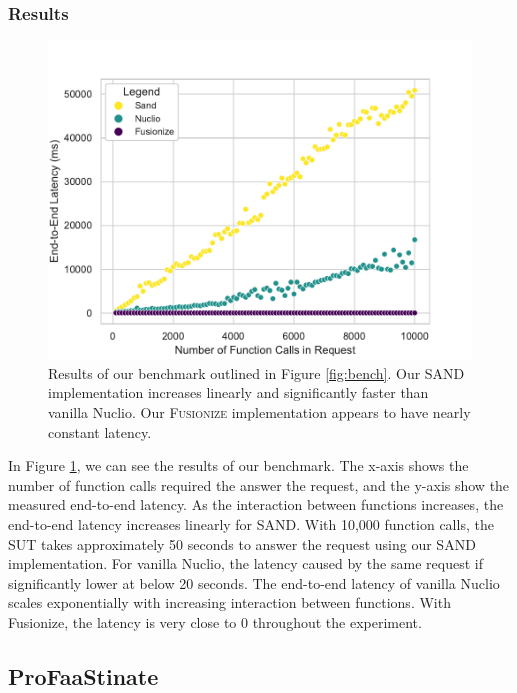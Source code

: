 \subsubsection{Results}

\begin{figure}
    \centering
    \includegraphics[width=\linewidth]{figures/latency_sand_fusionize}
    \caption{
        Results of our benchmark outlined in Figure \ref{fig:bench}. Our SAND
        implementation increases linearly and significantly faster than vanilla
        Nuclio. Our \textsc{Fusionize} implementation appears to have nearly
        constant latency.
    }
    \label{fig:latency_sand_fusionize}
\end{figure}


In Figure \ref{fig:latency_sand_fusionize}, we can see the results of our
benchmark. The x-axis shows the number of function calls required the answer the
request, and the y-axis show the measured end-to-end latency. As the interaction
between functions increases, the end-to-end latency increases linearly for SAND.
With 10,000 function calls, the SUT takes approximately 50 seconds to answer the
request using our SAND implementation. For vanilla Nuclio, the latency caused by
the same request if significantly lower at below 20 seconds. The end-to-end
latency of vanilla Nuclio scales exponentially with increasing interaction
between functions. With Fusionize, the latency is very close to 0 throughout the
experiment.

\subsection{ProFaaStinate}
